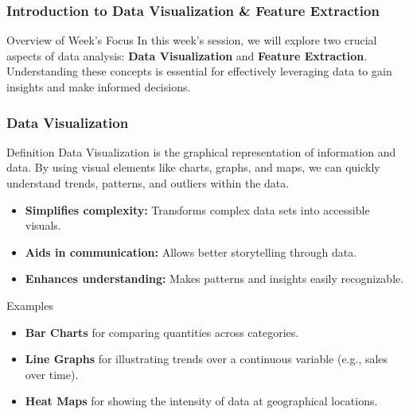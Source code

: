 \documentclass[aspectratio=169]{beamer}
\begin{document}
\frame{\titlepage}

\begin{frame}[fragile]
    \frametitle{Introduction to Data Visualization \& Feature Extraction}
    \begin{block}{Overview of Week's Focus}
        In this week’s session, we will explore two crucial aspects of data analysis: \textbf{Data Visualization} and \textbf{Feature Extraction}. 
        Understanding these concepts is essential for effectively leveraging data to gain insights and make informed decisions.
    \end{block}
\end{frame}

\begin{frame}[fragile]
    \frametitle{Data Visualization}
    \begin{block}{Definition}
        Data Visualization is the graphical representation of information and data. By using visual elements like charts, graphs, and maps, we can quickly understand trends, patterns, and outliers within the data.
    \end{block}
    
    \begin{itemize}
        \item \textbf{Simplifies complexity:} Transforms complex data sets into accessible visuals.
        \item \textbf{Aids in communication:} Allows better storytelling through data.
        \item \textbf{Enhances understanding:} Makes patterns and insights easily recognizable.
    \end{itemize}

    \begin{block}{Examples}
        \begin{itemize}
            \item \textbf{Bar Charts} for comparing quantities across categories.
            \item \textbf{Line Graphs} for illustrating trends over a continuous variable (e.g., sales over time).
            \item \textbf{Heat Maps} for showing the intensity of data at geographical locations.
        \end{itemize}
    \end{block}
\end{frame}
\end{document}

